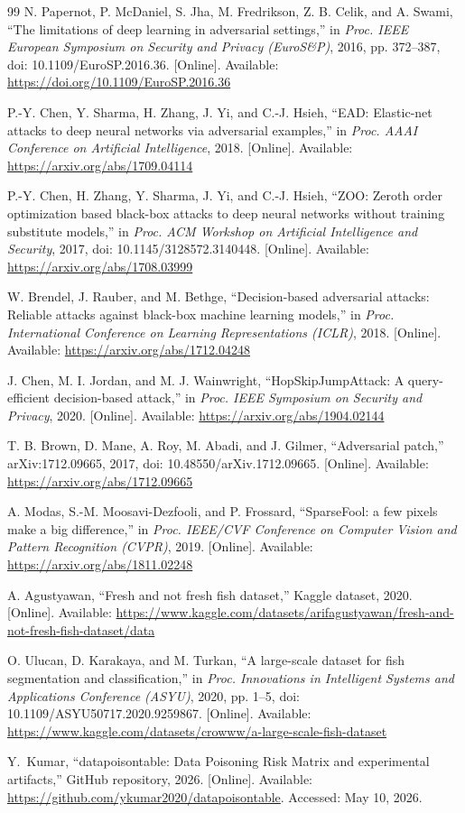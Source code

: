 \documentclass[conference]{IEEEtran}
\begin{document}
\begin{thebibliography}{99}
N. Papernot, P. McDaniel, S. Jha, M. Fredrikson, Z. B. Celik, and A. Swami, ``The limitations of deep learning in adversarial settings,'' in \emph{Proc. IEEE European Symposium on Security and Privacy (EuroS\&P)}, 2016, pp. 372--387, doi: 10.1109/EuroSP.2016.36. [Online]. Available: \url{https://doi.org/10.1109/EuroSP.2016.36}

P.-Y. Chen, Y. Sharma, H. Zhang, J. Yi, and C.-J. Hsieh, ``EAD: Elastic-net attacks to deep neural networks via adversarial examples,'' in \emph{Proc. AAAI Conference on Artificial Intelligence}, 2018. [Online]. Available: \url{https://arxiv.org/abs/1709.04114}

P.-Y. Chen, H. Zhang, Y. Sharma, J. Yi, and C.-J. Hsieh, ``ZOO: Zeroth order optimization based black-box attacks to deep neural networks without training substitute models,'' in \emph{Proc. ACM Workshop on Artificial Intelligence and Security}, 2017, doi: 10.1145/3128572.3140448. [Online]. Available: \url{https://arxiv.org/abs/1708.03999}

W. Brendel, J. Rauber, and M. Bethge, ``Decision-based adversarial attacks: Reliable attacks against black-box machine learning models,'' in \emph{Proc. International Conference on Learning Representations (ICLR)}, 2018. [Online]. Available: \url{https://arxiv.org/abs/1712.04248}

J. Chen, M. I. Jordan, and M. J. Wainwright, ``HopSkipJumpAttack: A query-efficient decision-based attack,'' in \emph{Proc. IEEE Symposium on Security and Privacy}, 2020. [Online]. Available: \url{https://arxiv.org/abs/1904.02144}

T. B. Brown, D. Mane, A. Roy, M. Abadi, and J. Gilmer, ``Adversarial patch,'' arXiv:1712.09665, 2017, doi: 10.48550/arXiv.1712.09665. [Online]. Available: \url{https://arxiv.org/abs/1712.09665}

A. Modas, S.-M. Moosavi-Dezfooli, and P. Frossard, ``SparseFool: a few pixels make a big difference,'' in \emph{Proc. IEEE/CVF Conference on Computer Vision and Pattern Recognition (CVPR)}, 2019. [Online]. Available: \url{https://arxiv.org/abs/1811.02248}

A. Agustyawan, ``Fresh and not fresh fish dataset,'' Kaggle dataset, 2020. [Online]. Available: \url{https://www.kaggle.com/datasets/arifagustyawan/fresh-and-not-fresh-fish-dataset/data}

O. Ulucan, D. Karakaya, and M. Turkan, ``A large-scale dataset for fish segmentation and classification,'' in \emph{Proc. Innovations in Intelligent Systems and Applications Conference (ASYU)}, 2020, pp. 1--5, doi: 10.1109/ASYU50717.2020.9259867. [Online]. Available: \url{https://www.kaggle.com/datasets/crowww/a-large-scale-fish-dataset}

Y.~Kumar, ``datapoisontable: Data Poisoning Risk Matrix and experimental artifacts,'' GitHub repository, 2026. [Online]. Available: \url{https://github.com/ykumar2020/datapoisontable}. Accessed: May 10, 2026.
\end{thebibliography}
\end{document}
